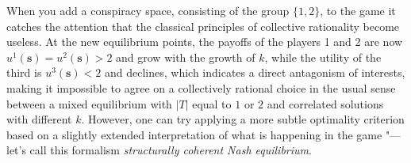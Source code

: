 When you add a conspiracy space, consisting of the group $\{1, 2\}$, to the game it catches the attention that the classical principles of collective rationality become useless. At the new equilibrium points, the payoffs of the players 1 and 2 are now $u^1(\mathbf{s}) = u^2(\mathbf{s}) > 2$ and grow with the growth of $k$, while the utility of the third is $u^3(\mathbf{s}) < 2$ and declines, which indicates a direct antagonism of interests, making it impossible to agree on a collectively rational choice in the usual sense between a mixed equilibrium with $\left|T \right|$ equal to $1$ or $2$ and correlated solutions with different $k$. However, one can try applying a more subtle optimality criterion based on a slightly extended interpretation of what is happening in the game "--- let's call this formalism \emph{structurally coherent Nash equilibrium}. %

